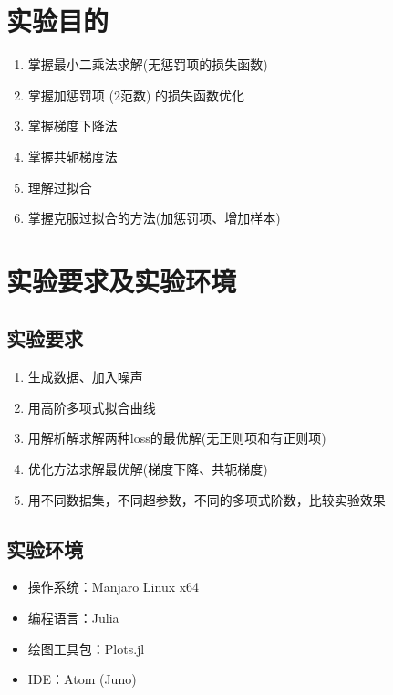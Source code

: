 \documentclass{ML}
\begin{document}
\maketitle

\tableofcontents
\newpage

\section{实验目的}

\begin{enumerate}
	\item 掌握最小二乘法求解(无惩罚项的损失函数)
	\item 掌握加惩罚项 (2范数) 的损失函数优化
	\item 掌握梯度下降法
	\item 掌握共轭梯度法
	\item 理解过拟合
	\item 掌握克服过拟合的方法(加惩罚项、增加样本)
\end{enumerate}

\section{实验要求及实验环境}

\subsection{实验要求}

\begin{enumerate}
	\item 生成数据、加入噪声
	\item 用高阶多项式拟合曲线
	\item 用解析解求解两种loss的最优解(无正则项和有正则项)
	\item 优化方法求解最优解(梯度下降、共轭梯度)
	\item 用不同数据集，不同超参数，不同的多项式阶数，比较实验效果
\end{enumerate}

\subsection{实验环境}

\begin{itemize}
	\item 操作系统：Manjaro Linux x64
	\item 编程语言：Julia
	\item 绘图工具包：Plots.jl
	\item IDE：Atom (Juno)
\end{itemize}
\end{document}
